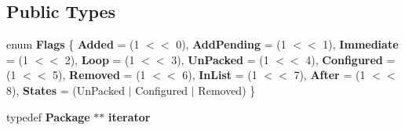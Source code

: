 \subsection*{\-Public \-Types}
\begin{DoxyCompactItemize}
\item 
enum {\bfseries \-Flags} \{ \*
{\bfseries \-Added} =  (1 $<$$<$ 0), 
{\bfseries \-Add\-Pending} =  (1 $<$$<$ 1), 
{\bfseries \-Immediate} =  (1 $<$$<$ 2), 
{\bfseries \-Loop} =  (1 $<$$<$ 3), 
\*
{\bfseries \-Un\-Packed} =  (1 $<$$<$ 4), 
{\bfseries \-Configured} =  (1 $<$$<$ 5), 
{\bfseries \-Removed} =  (1 $<$$<$ 6), 
{\bfseries \-In\-List} =  (1 $<$$<$ 7), 
\*
{\bfseries \-After} =  (1 $<$$<$ 8), 
{\bfseries \-States} =  (\-Un\-Packed $|$ \-Configured $|$ \-Removed)
 \}
\item 
typedef {\bf \-Package} $\ast$$\ast$ {\bfseries iterator}\label{classpkgOrderList_a8bd92c7c02fad483f24685435e098bd1}

\end{DoxyCompactItemize}
